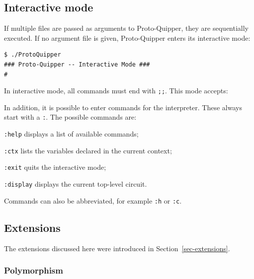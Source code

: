 \subsection{Interactive mode}

If multiple files are passed as arguments to Proto-Quipper, they 
are sequentially executed. If no argument file is given, Proto-Quipper 
enters its interactive mode:
\begin{verbatim}
$ ./ProtoQuipper
### Proto-Quipper -- Interactive Mode ###
# 
\end{verbatim}
In interactive mode, all commands must end with \verb#;;#. This mode accepts:
In addition, it is possible to enter commands for the
interpreter. These always start with a \verb#:#. The possible commands are:
\begin{compactitemize}
  \item \verb#:help# displays a list of available commands;
  \item \verb#:ctx# lists the variables declared in the current context;
  \item \verb#:exit# quits the interactive mode;
  \item \verb#:display# displays the current top-level circuit.
\end{compactitemize}
Commands can also be abbreviated, for example \verb#:h# or \verb#:c#.

\subsection{Extensions}

The extensions discussed here were introduced in
Section~\hyperref[sec-extensions]{\ref*{sec-extensions}}.

\subsubsection{Polymorphism}

